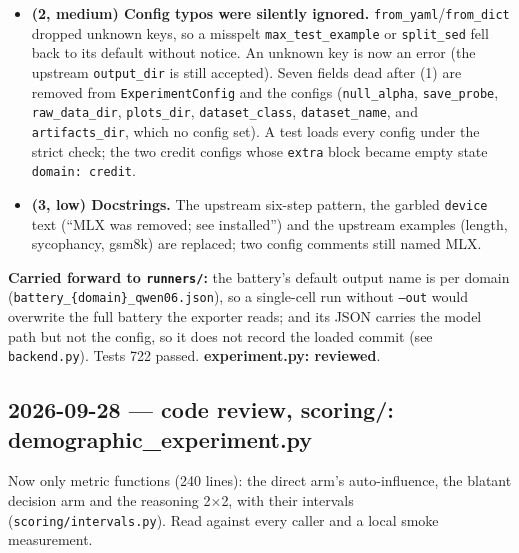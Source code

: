 \documentclass{article}
\begin{document}
\begin{itemize}
        \texttt{run\_battery} command (\texttt{--axes}/\texttt{--encodings} from the \texttt{extra} keys they
        carried, which nothing reads any more, and an \texttt{--out} of their own).
        \texttt{plotting.create\_comparison\_plot} has no caller left (decided with \texttt{plotting.py}).
        \texttt{experiment.py} is 138 lines.
  \item \textbf{(2, medium) Config typos were silently ignored.} \texttt{from\_yaml}/\texttt{from\_dict} dropped
        unknown keys, so a misspelt \texttt{max\_test\_example} or \texttt{split\_sed} fell back to its default
        without notice. An unknown key is now an error (the upstream \texttt{output\_dir} is still accepted).
        Seven fields dead after (1) are removed from \texttt{ExperimentConfig} and the configs
        (\texttt{null\_alpha}, \texttt{save\_probe}, \texttt{raw\_data\_dir}, \texttt{plots\_dir},
        \texttt{dataset\_class}, \texttt{dataset\_name}, and \texttt{artifacts\_dir}, which no config set). A test
        loads every config under the strict check; the two credit configs whose \texttt{extra} block became empty
        state \texttt{domain: credit}.
  \item \textbf{(3, low) Docstrings.} The upstream six-step pattern, the garbled \texttt{device} text (``MLX was
        removed; see installed'') and the upstream examples (length, sycophancy, gsm8k) are replaced; two config
        comments still named MLX.
\end{itemize}
\textbf{Carried forward to \texttt{runners/}:} the battery's default output name is per domain
(\texttt{battery\_\{domain\}\_qwen06.json}), so a single-cell run without \texttt{--out} would overwrite the full
battery the exporter reads; and its JSON carries the model path but not the config, so it does not record the
loaded commit (see \texttt{backend.py}). Tests 722 passed. \textbf{experiment.py: reviewed}.

\subsection*{2026-09-28 --- code review, scoring/: demographic\_experiment.py}
Now only metric functions (240 lines): the direct arm's auto-influence, the blatant decision arm and the
reasoning 2$\times$2, with their intervals (\texttt{scoring/intervals.py}). Read against every caller and a local
smoke measurement.
\end{document}
